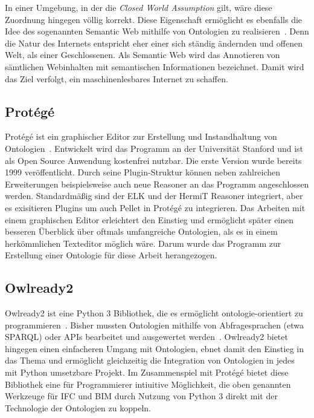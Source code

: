 In einer Umgebung, in der die \textit{Closed World Assumption} gilt, wäre diese Zuordnung hingegen völlig korrekt.
Diese Eigenschaft ermöglicht es ebenfalls die Idee des sogenannten \glqq{}Semantic Web\grqq{} mithilfe von Ontologien zu realisieren~\cite{SemanticWebLee}.
Denn die Natur des Internets entspricht eher einer sich ständig ändernden und \glqq{}offenen\grqq{} Welt, als einer Geschlossenen.
Als Semantic Web wird das Annotieren von sämtlichen Webinhalten mit semantischen Informationen bezeichnet.
Damit wird das Ziel verfolgt, ein maschinenlesbares Internet zu schaffen. 

\subsection{Protégé}
Protégé ist ein graphischer Editor zur Erstellung und Instandhaltung von Ontologien~\cite{Protege}.
Entwickelt wird das Programm an der Universität Stanford und ist als Open Source Anwendung kostenfrei nutzbar.
Die erste Version wurde bereits 1999 veröffentlicht.
Durch seine Plugin-Struktur können neben zahlreichen Erweiterungen beispielsweise auch neue Reasoner an das Programm angeschlossen werden.
Standardmäßig sind der ELK und der HermiT Reasoner integriert, aber es exisitieren Plugins um auch Pellet in Protégé zu integrieren.
Das Arbeiten mit einem graphischen Editor erleichtert den Einstieg und ermöglicht später einen besseren Überblick über oftmals umfangreiche Ontologien, als es in einem herkömmlichen Texteditor möglich wäre.
Darum wurde das Programm zur Erstellung einer Ontologie für diese Arbeit herangezogen.

\subsection{Owlready2}
Owlready2 ist eine Python 3 Bibliothek, die es ermöglicht \glqq{}ontologie-orientiert\grqq{} zu programmieren~\cite{Owlready}.
Bisher mussten Ontologien mithilfe von Abfragesprachen (etwa SPARQL) oder APIs bearbeitet und ausgewertet werden~\cite{SPARQLF_W3C}.
Owlready2 bietet hingegen einen einfacheren Umgang mit Ontologien, ebnet damit den Einstieg in das Thema und ermöglicht gleichzeitig die Integration von Ontologien in jedes mit Python umsetzbare Projekt.
Im Zusammenspiel mit Protégé bietet diese Bibliothek eine für Programmierer intiuitive Möglichkeit, die oben genannten Werkzeuge für IFC und BIM durch Nutzung von Python 3 direkt mit der Technologie der Ontologien zu koppeln.
